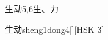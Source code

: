 \begin{entry}{生动}{5,6}{⽣、⼒}
  \begin{phonetics}{生动}{sheng1dong4}[][HSK 3]
  \end{phonetics}
\end{entry}
